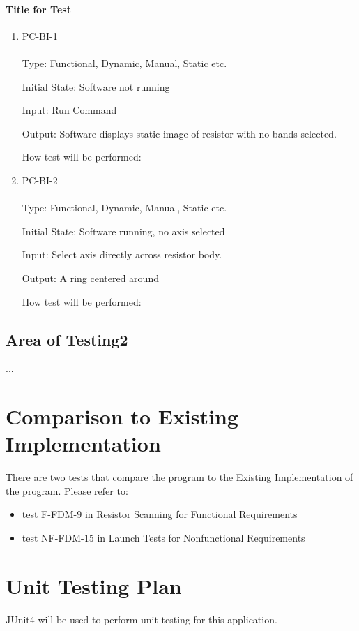 \documentclass[12pt, titlepage]{article}
\begin{document}
\paragraph{Title for Test}
\begin{enumerate}
\item{PC-BI-1\\}
\\
Type: Functional, Dynamic, Manual, Static etc.
					
Initial State: Software not running
					
Input: Run Command
					
Output: Software displays static image of resistor with no bands selected.
					
How test will be performed: 
					
\item{PC-BI-2\\}
\\
Type: Functional, Dynamic, Manual, Static etc.
					
Initial State: Software running, no axis selected
					
Input: Select axis directly across resistor body.
					
Output:  A ring centered around
					
How test will be performed: 
\end{enumerate}
\subsection{Area of Testing2}
...
	
\section{Comparison to Existing Implementation}
There are two tests that compare the program to the Existing Implementation of the program. Please refer to:
\begin{itemize}
\item test F-FDM-9 in Resistor Scanning for Functional Requirements
\item test NF-FDM-15 in Launch Tests for Nonfunctional Requirements 
\end{itemize}



				
\section{Unit Testing Plan}	
\par JUnit4 will be used to perform unit testing for this application.	
\end{document}
